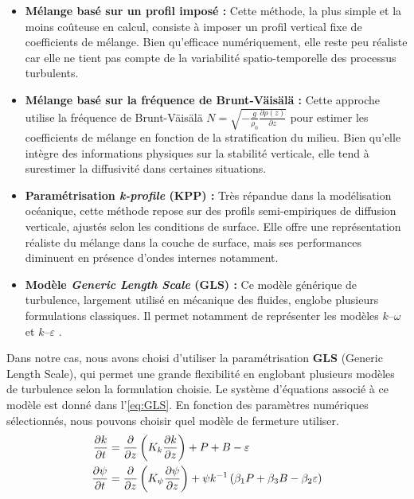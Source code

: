 \begin{itemize}
	\item \textbf{Mélange basé sur un profil imposé :} Cette méthode, la plus simple et la moins coûteuse en calcul, consiste à imposer un profil vertical fixe de coefficients de mélange. Bien qu'efficace numériquement, elle reste peu réaliste car elle ne tient pas compte de la variabilité spatio-temporelle des processus turbulents.
	
	\item \textbf{Mélange basé sur la fréquence de Brunt-Väisälä :} Cette approche utilise la fréquence de Brunt-Väisälä $N = \sqrt{-{\frac {g}{\rho _{0}}}{\frac {\partial \rho (z)}{\partial z}}}$ pour estimer les coefficients de mélange en fonction de la stratification du milieu. Bien qu’elle intègre des informations physiques sur la stabilité verticale, elle tend à surestimer la diffusivité dans certaines situations.

	\item \textbf{Paramétrisation \textit{k-profile} (KPP) \cite{large_oceanic_1994} :} Très répandue dans la modélisation océanique, cette méthode repose sur des profils semi-empiriques de diffusion verticale, ajustés selon les conditions de surface. Elle offre une représentation réaliste du mélange dans la couche de surface, mais ses performances diminuent en présence d'ondes internes notamment.

	\item \textbf{Modèle \textit{Generic Length Scale} (GLS) :} Ce modèle générique de turbulence, largement utilisé en mécanique des fluides, englobe plusieurs formulations classiques. Il permet notamment de représenter les modèles $k$–$\omega$ \cite{kolmogorov_equations_1942} et $k$–$\varepsilon$ \cite{jones_prediction_1972}.
\end{itemize}

Dans notre cas, nous avons choisi d’utiliser la paramétrisation \textbf{GLS} (Generic Length Scale), qui permet une grande flexibilité en englobant plusieurs modèles de turbulence selon la formulation choisie. Le système d’équations associé à ce modèle est donné dans l’\autoref{eq:GLS}. En fonction des paramètres numériques sélectionnés, nous pouvons choisir quel modèle de fermeture utiliser.
\begin{subequations}
\label{eq:GLS}
\begin{align}
	\frac{\partial k}{\partial t} & = \frac{\partial }{\partial z} \left( K_k \frac{\partial k}{\partial z} \right) + P + B - \varepsilon \label{eq:tke prog} \\
	\frac{\partial \psi}{\partial t} & = \frac{\partial }{\partial z} \left( K_\psi \frac{\partial \psi}{\partial z} \right) + \psi k^{-1} \left( \beta_1 P + \beta_3 B - \beta_2 \varepsilon \right)
\end{align}
\end{subequations}

